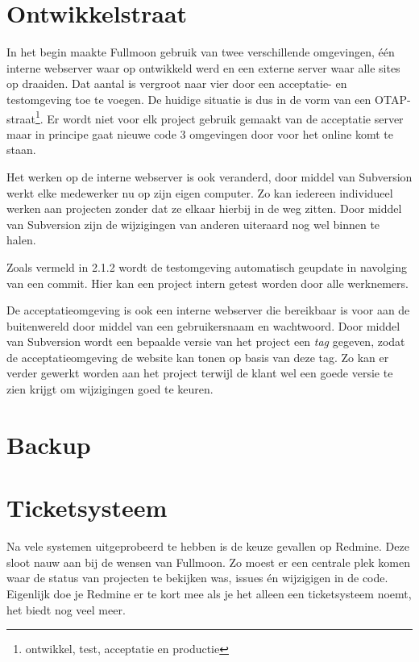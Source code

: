 \section{Ontwikkelstraat}

In het begin maakte Fullmoon gebruik van twee verschillende omgevingen, één interne webserver waar op ontwikkeld werd en een externe server waar alle sites op draaiden. Dat aantal is vergroot naar vier door een acceptatie- en testomgeving toe te voegen. De huidige situatie is dus in de vorm van een OTAP-straat\footnote{ontwikkel, test, acceptatie en productie}. Er wordt niet voor elk project gebruik gemaakt van de acceptatie server maar in principe gaat nieuwe code 3 omgevingen door voor het online komt te staan.

Het werken op de interne webserver is ook veranderd, door middel van Subversion werkt elke medewerker nu op zijn eigen computer. Zo kan iedereen individueel werken aan projecten zonder dat ze elkaar hierbij in de weg zitten. Door middel van Subversion zijn de wijzigingen van anderen uiteraard nog wel binnen te halen.

Zoals vermeld in 2.1.2 wordt de testomgeving automatisch geupdate in navolging van een commit. Hier kan een project intern getest worden door alle werknemers.

De acceptatieomgeving is ook een interne webserver die bereikbaar is voor aan de buitenwereld door middel van een gebruikersnaam en wachtwoord. Door middel van Subversion wordt een bepaalde versie van het project een \emph{tag} gegeven, zodat de acceptatieomgeving de website kan tonen op basis van deze tag. Zo kan er verder gewerkt worden aan het project terwijl de klant wel een goede versie te zien krijgt om wijzigingen goed te keuren.

\section{Backup}



\section{Ticketsysteem}

Na vele systemen uitgeprobeerd te hebben is de keuze gevallen op Redmine. Deze sloot nauw aan bij de wensen van Fullmoon. Zo moest er een centrale plek komen waar de status van projecten te bekijken was, issues én wijzigigen in de code. Eigenlijk doe je Redmine er te kort mee als je het alleen een ticketsysteem noemt, het biedt nog veel meer.

